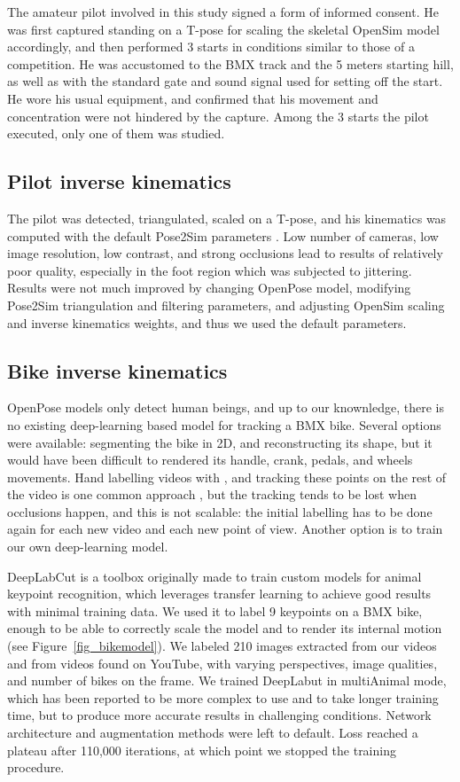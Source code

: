 The amateur pilot involved in this study signed a form of informed consent. He was first captured standing on a T-pose for scaling the skeletal OpenSim model accordingly, and then performed 3 starts in conditions similar to those of a competition. He was accustomed to the BMX track and the 5 meters starting hill, as well as with the standard gate and sound signal used for setting off the start. He wore his usual equipment, and confirmed that his movement and concentration were not hindered by the capture. Among the 3 starts the pilot executed, only one of them was studied. 


\subsection{Pilot inverse kinematics}

The pilot was detected, triangulated, scaled on a T-pose, and his kinematics was computed with the default Pose2Sim parameters \cite{Pagnon2022b}. Low number of cameras, low image resolution, low contrast, and strong occlusions lead to results of relatively poor quality, especially in the foot region which was subjected to jittering. Results were not much improved by changing OpenPose model, modifying Pose2Sim triangulation and filtering parameters, and adjusting OpenSim scaling and inverse kinematics weights, and thus we used the default parameters.


\subsection{Bike inverse kinematics}

OpenPose models only detect human beings, and up to our knownledge, there is no existing deep-learning based model for tracking a BMX bike. Several options were available: segmenting the bike in 2D, and reconstructing its shape, but it would have been difficult to rendered its handle, crank, pedals, and wheels movements. Hand labelling videos with \cite{Kinovea}, and tracking these points on the rest of the video is one common approach \cite{Grigg2018}, but the tracking tends to be lost when occlusions happen, and this is not scalable: the initial labelling has to be done again for each new video and each new point of view. Another option is to train our own deep-learning model.

DeepLabCut \cite{Mathis2018, Lauer2022} is a toolbox originally made to train custom models for animal keypoint recognition, which leverages transfer learning to achieve good results with minimal training data. We used it to label 9 keypoints on a BMX bike, enough to be able to correctly scale the model and to render its internal motion (see Figure~\ref{fig_bikemodel}). We labeled 210 images extracted from our videos and from videos found on YouTube, with varying perspectives, image qualities, and number of bikes on the frame. We trained DeepLabut in multiAnimal mode, which has been reported to be more complex to use and to take longer training time, but to produce more accurate results in challenging conditions. Network architecture and augmentation methods were left to default. Loss reached a plateau after 110,000 iterations, at which point we stopped the training procedure.

